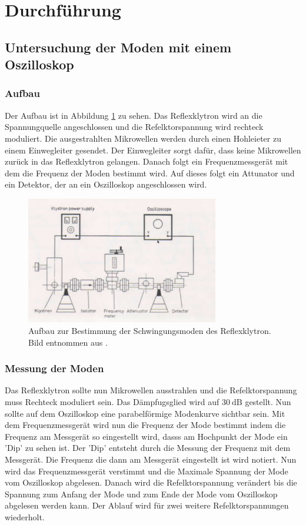\section{Durchführung}
\label{sec:Durchführung}

\subsection{Untersuchung der Moden mit einem Oszilloskop}
\subsubsection{Aufbau}
Der Aufbau ist in Abbildung \ref{fig:moden_aufbau} zu sehen.
Das Reflexklytron wird an die Spannungquelle angeschlossen und die Refelktorspannung wird rechteck moduliert.
Die ausgestrahlten Mikrowellen werden durch einen Hohleieter zu einem Einwegleiter gesendet.
Der Einwegleiter sorgt dafür, dass keine Mikrowellen zurück in das Reflexklytron gelangen.
Danach folgt ein Frequenzmessgerät mit dem die Frequenz der Moden bestimmt wird.
Auf dieses folgt ein Attunator und ein Detektor, der an ein Oszilloskop angeschlossen wird.

\begin{figure}
    \centering
    \includegraphics[width=0.75\textwidth]{content/data/Aufbau_Moden.png}
    \caption{Aufbau zur Bestimmung der Schwingungsmoden des Reflexklytron. Bild entnommen aus \cite[8]{Anleitung}.}
    \label{fig:moden_aufbau}
\end{figure}

\subsubsection{Messung der Moden}
Das Reflexklytron sollte nun Mikrowellen ausstrahlen und die Refelktorspannung muss Rechteck moduliert sein. Das Dämpfugsglied wird auf $\SI{30}{\dB}$ gestellt.
Nun sollte auf dem Oszilloskop eine parabelförmige Modenkurve sichtbar sein.
Mit dem Frequenzmessgerät wird nun die Frequenz der Mode bestimmt indem die Frequenz am Messgerät so eingestellt wird, dasss am Hochpunkt der Mode ein 'Dip' zu sehen ist.
Der 'Dip' entsteht durch die Messung der Frequenz mit dem Messgerät.
Die Frequenz die dann am Messgerät eingestellt ist wird notiert.
Nun wird das Frequenzmessgerät verstimmt und die Maximale Spannung der Mode vom Oszilloskop abgelesen.
Danach wird die Refelktorspannung verändert bis die Spannung zum Anfang der Mode und zum Ende der Mode vom Oszilloskop abgelesen werden kann.
Der Ablauf wird für zwei weitere Refelktorspannungen wiederholt.



